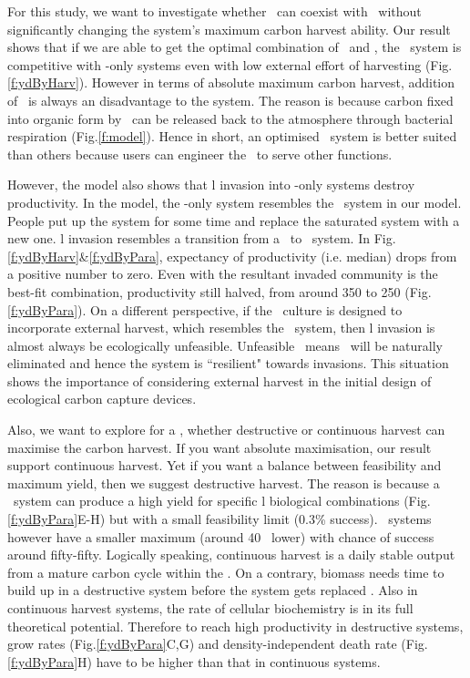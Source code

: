 \documentclass[../thesis.tex]{subfiles} %
\begin{document}
For this study, we want to investigate whether \bac\ can coexist with \phy\ without significantly changing the system’s maximum carbon harvest ability.  Our result shows that if we are able to get the optimal combination of \phy\ and \bac, the \PBH\ system is competitive with \phy-only systems even with low external effort of harvesting (Fig.\ref{f:ydByHarv}).  However in terms of absolute maximum carbon harvest, addition of \bac\ is always an disadvantage to the system.  The reason is because carbon fixed into organic form by \phy\ can be released back to the atmosphere through bacterial respiration (Fig.\ref{f:model}).  Hence in short, an optimised \PBH\ system is better suited than others because users can engineer the \bac\ to serve other functions.

However, the model also shows that \bac l invasion into \phy-only systems destroy productivity.  In the model, the \phy-only system resembles the \PoN\ system in our model.  People put up the system for some time and replace the saturated system with a new one.  \Bac l invasion resembles a transition from a \PoN\ to \PBN\ system.  In Fig.\ref{f:ydByHarv}\&\ref{f:ydByPara}, expectancy of productivity (i.e. median) drops from a positive number to zero.  Even with the resultant invaded community is the best-fit combination, productivity still halved, from around 350 to 250 \dxdt (Fig.\ref{f:ydByPara}).  On a different perspective, if the \phy\ culture is designed to incorporate external harvest, which resembles the \PoH\ system, then \bac l invasion is almost always be ecologically unfeasible.  Unfeasible \PBH\ means \bac\ will be naturally eliminated and hence the system is ``resilient" towards invasions.  This situation shows the importance of considering external harvest in the initial design of ecological carbon capture devices.

Also, we want to explore for a \pbs, whether destructive or continuous harvest can maximise the carbon harvest.  If you want absolute maximisation, our result support continuous harvest.  Yet if you want a balance between feasibility and maximum yield, then we suggest destructive harvest.  The reason is because a \PBH\ system can produce a high yield for specific \bac l biological combinations (Fig.\ref{f:ydByPara}E-H) but with a small feasibility limit (0.3\% success).  \PBN\ systems however have a smaller maximum (around 40 \dxdt\ lower) with chance of success around fifty-fifty.  Logically speaking, continuous harvest is a daily stable output from a mature carbon cycle within the \pbs.  On a contrary, biomass needs time to build up in a destructive system before the system gets replaced \autocite{aytekin2016statistical}.  Also in continuous harvest systems, the rate of cellular biochemistry is in its full theoretical potential.  Therefore to reach high productivity in destructive systems, grow rates (Fig.\ref{f:ydByPara}C,G) and density-independent death rate (Fig.\ref{f:ydByPara}H) have to be higher than that in continuous systems.
\end{document}
